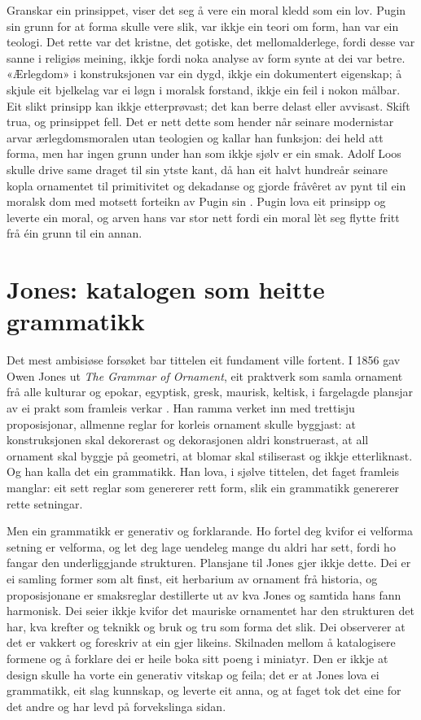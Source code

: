 Granskar ein prinsippet, viser det seg å vere ein moral kledd som ein lov. Pugin sin grunn for at forma skulle vere slik, var ikkje ein teori om form, han var ein teologi. Det rette var det kristne, det gotiske, det mellomalderlege, fordi desse var sanne i religiøs meining, ikkje fordi noka analyse av form synte at dei var betre. «Ærlegdom» i konstruksjonen var ein dygd, ikkje ein dokumentert eigenskap; å skjule eit bjelkelag var ei løgn i moralsk forstand, ikkje ein feil i nokon målbar. Eit slikt prinsipp kan ikkje etterprøvast; det kan berre delast eller avvisast. Skift trua, og prinsippet fell. Det er nett dette som hender når seinare modernistar arvar ærlegdomsmoralen utan teologien og kallar han funksjon: dei held att forma, men har ingen grunn under han som ikkje sjølv er ein smak. Adolf Loos skulle drive same draget til sin ytste kant, då han eit halvt hundreår seinare kopla ornamentet til primitivitet og dekadanse og gjorde fråvêret av pynt til ein moralsk dom med motsett forteikn av Pugin sin \autocite{loos1908ornament}. Pugin lova eit prinsipp og leverte ein moral, og arven hans var stor nett fordi ein moral lèt seg flytte fritt frå éin grunn til ein annan.

\section{Jones: katalogen som heitte grammatikk}

Det mest ambisiøse forsøket bar tittelen eit fundament ville fortent. I 1856 gav Owen Jones ut \textit{The Grammar of Ornament}, eit praktverk som samla ornament frå alle kulturar og epokar, egyptisk, gresk, maurisk, keltisk, i fargelagde plansjar av ei prakt som framleis verkar \autocite{jones1856grammar}. Han ramma verket inn med trettisju proposisjonar, allmenne reglar for korleis ornament skulle byggjast: at konstruksjonen skal dekorerast og dekorasjonen aldri konstruerast, at all ornament skal byggje på geometri, at blomar skal stiliserast og ikkje etterliknast. Og han kalla det ein grammatikk. Han lova, i sjølve tittelen, det faget framleis manglar: eit sett reglar som genererer rett form, slik ein grammatikk genererer rette setningar.

Men ein grammatikk er generativ og forklarande. Ho fortel deg kvifor ei velforma setning er velforma, og let deg lage uendeleg mange du aldri har sett, fordi ho fangar den underliggjande strukturen. Plansjane til Jones gjer ikkje dette. Dei er ei samling former som alt finst, eit herbarium av ornament frå historia, og proposisjonane er smaksreglar destillerte ut av kva Jones og samtida hans fann harmonisk. Dei seier ikkje kvifor det mauriske ornamentet har den strukturen det har, kva krefter og teknikk og bruk og tru som forma det slik. Dei observerer at det er vakkert og foreskriv at ein gjer likeins. Skilnaden mellom å katalogisere formene og å forklare dei er heile boka sitt poeng i miniatyr. Den er ikkje at design skulle ha vorte ein generativ vitskap og feila; det er at Jones lova ei grammatikk, eit slag kunnskap, og leverte eit anna, og at faget tok det eine for det andre og har levd på forvekslinga sidan.

